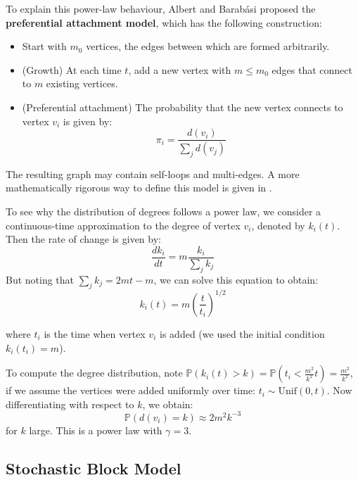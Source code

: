 \documentclass{article}
\begin{document}
To explain this power-law behaviour, Albert and Barab\'{a}si proposed the \textbf{preferential attachment model}, which has the following construction:
\begin{itemize}
    \item Start with $m_0$ vertices, the edges between which are formed arbitrarily.  
    \item (Growth) At each time $t$, add a new vertex with $m\leq m_0$ edges that connect to $m$ existing vertices.
    \item (Preferential attachment) The probability that the new vertex connects to vertex $v_i$ is given by:
    \begin{equation*}
        \pi_i = \frac{d(v_i)}{\sum_j d(v_j)}
    \end{equation*}
\end{itemize}

The resulting graph may contain self-loops and multi-edges. A more mathematically rigorous way to define this model is given in \citep{barabasi2016network}.  

\begin{unexaminable}
    To see why the distribution of degrees follows a power law, we consider a continuous-time approximation to the degree of vertex $v_i$, denoted by $k_i(t)$. Then the rate of change is given by:
    \begin{equation*}
        \frac{d k_i}{dt} = m \frac{k_i}{\sum_j k_j}
    \end{equation*}
    But noting that $\sum_j k_j = 2mt - m$, we can solve this equation  to obtain:
    \begin{equation*}
        k_i(t) = m \left( \frac{t}{t_i} \right)^{1/2}
    \end{equation*}

    where $t_i$ is the time when vertex $v_i$ is added (we used the initial condition $k_i(t_i)=m$).

    To compute the degree distribution, note $\mathbb{P}(k_i(t)>k) = \mathbb{P}(t_i < \frac{m^2}{k^2} t) = \frac{m^2}{k^2}$, if we assume the vertices were added uniformly over time: $t_i \sim \mathrm{Unif}(0,t)$. Now differentiating with respect to $k$, we obtain:
    \begin{equation*}
        \mathbb{P}(d(v_i)=k) \approx 2m^2 k^{-3}
    \end{equation*}
    for $k$ large. This is a power law with $\gamma=3$.
\end{unexaminable}

\subsection{Stochastic Block Model}
\end{document}
